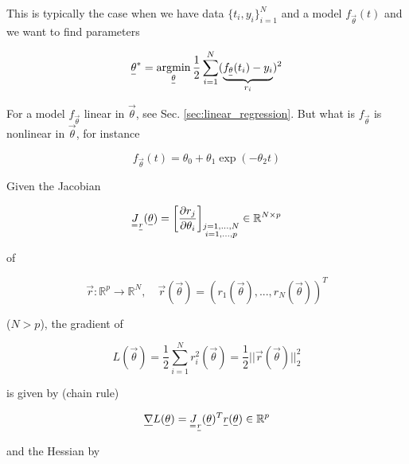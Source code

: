 This is typically the case when we have data $\{t_i,y_i\}_{i=1}^N$ and a 
model $f_\vec{\theta}(t)$ and we want to find parameters

\begin{equation}
    \vec{\theta}^* = \argmin_{\vec{\theta}} \frac{1}{2} \sum_{i = 1}^{N} (\underbrace{f_\vec{\theta}(t_i) - y_i}_{r_i})^2
\end{equation}

For a model $f_\vec{\theta}$ linear in $\vec{\theta}$, see Sec. \ref{sec:linear_regression}.
But what is $f_\vec{\theta}$ is nonlinear in $\vec{\theta}$, for instance

\begin{equation}
    f_\vec{\theta}(t) = \theta_0 + \theta_1 \exp{\left(-\theta_2 t\right)}
\end{equation}


Given the Jacobian

\begin{equation}
    \mat{J}_\vec{r}(\vec{\theta}) = \left[ \frac{\partial r_j}{\partial \theta_i} \right]_{\substack{
        j=1,...,N \\
        i=1,...,p
    }} \in \mathbb{R}^{N \times p}
\end{equation}

of

\begin{equation}
    \vec{r}: \mathbb{R}^p \to \mathbb{R}^N, \quad \vec{r}(\vec{\theta}) = (r_1(\vec{\theta}),...,r_N(\vec{\theta}))^T
\end{equation}

($N>p$), the gradient of

\begin{equation}
    L(\vec{\theta}) = \frac{1}{2} \sum_{i=1}^{N} r_i^2(\vec{\theta}) = \frac{1}{2} ||\vec{r}(\vec{\theta})||_2^2
\end{equation}

is given by (chain rule)

\begin{equation}
    \vec{\nabla} L(\vec{\theta}) = \mat{J}_\vec{r}(\vec{\theta})^T \vec{r}(\vec{\theta}) \in \mathbb{R}^p
\end{equation}

and the Hessian by

